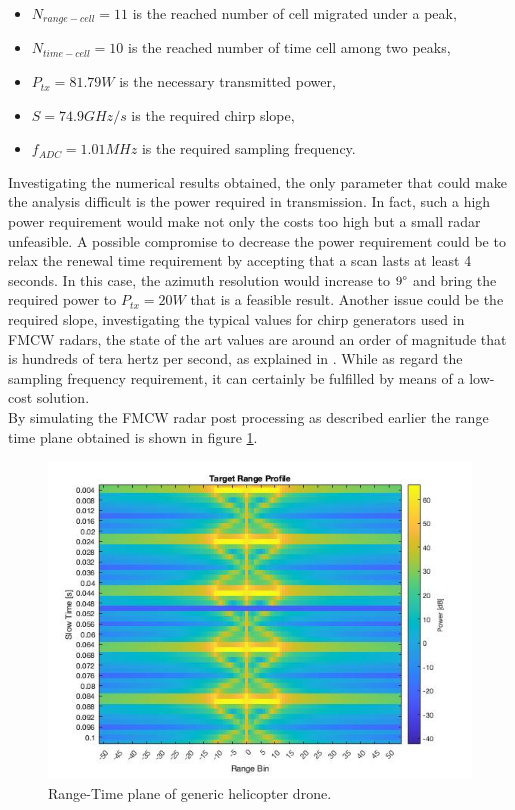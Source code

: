 \begin{itemize}
    
    \item $N_{range-cell} = 11$ is the reached number of cell migrated under a peak,
         
    \item $N_{time-cell} = 10$ is the reached number of time cell among two peaks,

    \item $P_{tx} = 81.79 W$ is the necessary transmitted power,
    
    \item $S = 74.9 GHz/s$ is the required chirp slope,
    
    \item $f_{ADC} = 1.01 MHz$ is the required sampling frequency.
    
\end{itemize}

 Investigating the numerical results obtained, the only parameter that could make the analysis difficult is the power required in transmission. In fact, such a high power requirement would make not only the costs too high but a small radar unfeasible. A possible compromise to decrease the power requirement could be to relax the renewal time requirement by accepting that a scan lasts at least 4 seconds. In this case, the azimuth resolution would increase to $9\degree$ and bring the required power to $P_{tx} = 20 W$ that is a feasible result. Another issue could be the required slope, investigating the typical values for chirp generators used in FMCW radars, the state of the art values are around an order of magnitude that is hundreds of tera hertz per second, as explained in \cite{slope}. While as regard the sampling frequency requirement, it can certainly be fulfilled by means of a low-cost solution.\\ By simulating the FMCW radar post processing as described earlier the range time plane obtained is shown in figure \ref{rangetime_map_helic}.

\begin{figure}[h!]
\centering
\includegraphics[width=12cm]{FMCW mD analysis-chap4/img/Range-time_generic_helic_result.jpg}
\caption{Range-Time plane of generic helicopter drone.}
\label{rangetime_map_helic}
\end{figure}

